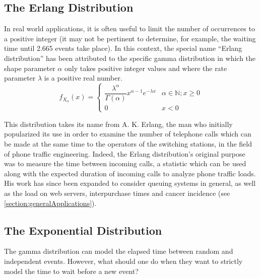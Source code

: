 \documentclass[12pt]{article}
\begin{document}
\subsection{The Erlang Distribution}
In real world applications, it is often useful to limit the number of occurrences to a positive integer (it may not be
pertinent to determine, for example, the waiting time until 2.665 events take place). In this context, the special name
“Erlang distribution” has been attributed to the specific gamma distribution in which the shape parameter $\alpha$ only
takes positive integer values and where the rate parameter $\lambda$ is a positive real number.
\begin{equation*}
	f_{X_\alpha}(x)	= 	\begin{cases}
							\dfrac{\lambda^\alpha}{\Gamma(\alpha)}x^{\alpha-1}e^{-\lambda x}  & \alpha\in\mathbb{N}; x\geq0\\
							0  & x<0
  						\end{cases}
\end{equation*}

This distribution takes its name from A. K. Erlang, the man who initially popularized its use in order to examine the
number of telephone calls which can be made at the same time to the operators of the switching stations, in the field of
phone traffic engineering. Indeed, the Erlang distribution's original purpose was to measure the time between incoming
calls, a statistic which can be used along with the expected duration of incoming calls to analyze phone traffic loads.
His work has since been expanded to consider queuing systems in general, as well as the load on web servers,
interpurchase times and cancer incidence (see \autoref{section:generalApplications})\cite{zachWhatErlangDistribution2020}.


\pagebreak
\subsection{The Exponential Distribution}
The gamma distribution can model the elapsed time between random and independent events. However, what should one do
when they want to strictly model the time to wait before a new event?
\end{document}
